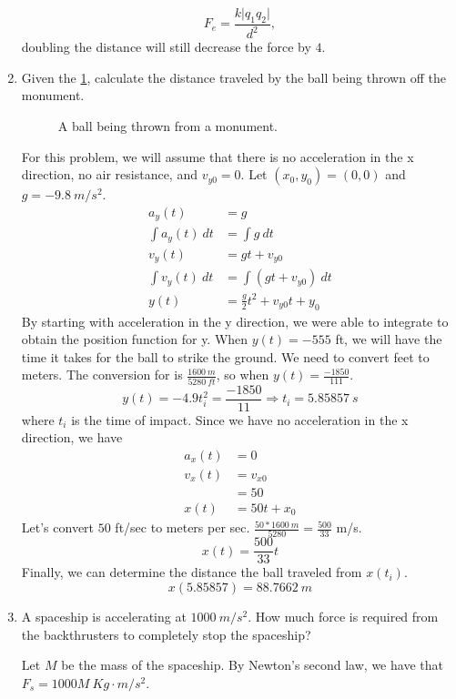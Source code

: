 \begin{enumerate}
  \[
  F_e = \frac{k\lvert q_1q_2\rvert}{d^2},
  \]
  doubling the distance will still decrease the force by \(4\).
\item
  Given the \cref{NUPOCphysics5}, calculate the distance traveled by the ball
  being thrown off the monument.
  \begin{figure}[H]
    \centering
    
    \caption{A ball being thrown from a monument.}
    \label{NUPOCphysics5}
  \end{figure}
  For this problem, we will assume that there is no acceleration in the x
  direction, no air resistance, and \(v_{y0} = 0\).
  Let \((x_0, y_0) = (0, 0)\) and \(g = -9.8 \ m/s^2\). 
  \begin{align*}
    a_y(t) &= g\\
    \int a_y(t) \ dt &= \int g \ dt\\
    v_y(t) &= gt + v_{y0}\\
    \int v_y(t) \ dt &= \int(gt + v_{y0}) \ dt\\
    y(t) &= \frac{g}{2}t^2 + v_{y0}t + y_0
  \end{align*}
  By starting with acceleration in the y direction, we were able to integrate
  to obtain the position function for y.
  When \(y(t) = -555\) ft, we will have the time it takes for the ball to strike
  the ground.
  We need to convert feet to meters.
  The conversion for is \(\frac{1600 \ m}{5280 \ ft}\), so when
  \(y(t) = \frac{-1850}{111}\).
  \[
  y(t) = -4.9t_i^2 = \frac{-1850}{11}\Rightarrow t_i = 5.85857 \ s
  \]
  where \(t_i\) is the time of impact.
  Since we have no acceleration in the x direction, we have
  \begin{align*}
    a_x(t) &= 0\\
    v_x(t) &= v_{x0}\\
           &= 50\\
    x(t) &= 50t + x_0
  \end{align*}
  Let's convert \(50\) ft/sec to meters per sec.
  \(\frac{50 * 1600 \ m}{5280} = \frac{500}{33}\) m/s.
  \[
  x(t) = \frac{500}{33}t
  \]
  Finally, we can determine the distance the ball traveled from \(x(t_i)\).
  \[
  x(5.85857) = 88.7662 \ m
  \]
\item
  A spaceship is accelerating at \(1000 \ m/s^2\).
  How much force is required from the backthrusters to completely stop the
  spaceship?
  \par\smallskip
  Let \(M\) be the mass of the spaceship.
  By Newton's second law, we have that \(F_s = 1000M \ Kg\cdot m/s^2\).

\end{enumerate}
